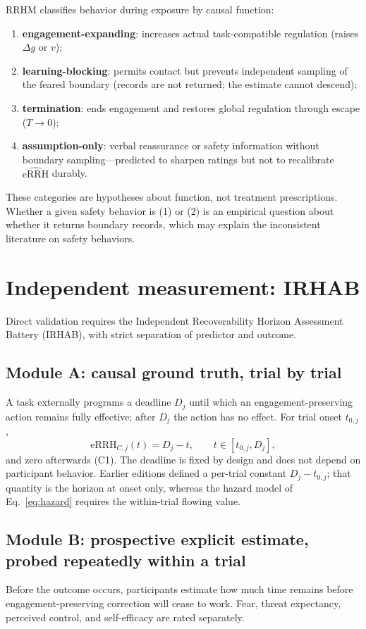 \documentclass[9pt,twocolumn]{article}
\newcommand{\eRRHhat}{\widehat{\mathrm{eRRH}}}
\begin{document}
RRHM classifies behavior during exposure by causal function:
\begin{enumerate}
\item \textbf{engagement-expanding}: increases actual task-compatible regulation (raises $\Delta g$ or $v$);
\item \textbf{learning-blocking}: permits contact but prevents independent sampling of the feared boundary (records are not returned; the estimate cannot descend);
\item \textbf{termination}: ends engagement and restores global regulation through escape ($T\to0$);
\item \textbf{assumption-only}: verbal reassurance or safety information without boundary sampling---predicted to sharpen ratings but not to recalibrate $\eRRHhat$ durably.
\end{enumerate}
These categories are hypotheses about function, not treatment prescriptions. Whether a given safety behavior is (1) or (2) is an empirical question about whether it returns boundary records, which may explain the inconsistent literature on safety behaviors.

\section{Independent measurement: IRHAB}
\label{sec:irhab}
Direct validation requires the Independent Recoverability Horizon Assessment Battery (IRHAB), with strict separation of predictor and outcome.

\subsection{Module A: causal ground truth, trial by trial}
A task externally programs a deadline $D_j$ until which an engagement-preserving action remains fully effective; after $D_j$ the action has no effect. For trial onset $t_{0,j}$,
\[
\mathrm{eRRH}_{C,j}(t)=D_j-t,\qquad t\in[t_{0,j},D_j],
\]
and zero afterwards (C1). The deadline is fixed by design and does not depend on participant behavior. Earlier editions defined a per-trial constant $D_j-t_{0,j}$; that quantity is the horizon at onset only, whereas the hazard model of Eq.~\ref{eq:hazard} requires the within-trial flowing value.

\subsection{Module B: prospective explicit estimate, probed repeatedly within a trial}
Before the outcome occurs, participants estimate how much time remains before engagement-preserving correction will cease to work. Fear, threat expectancy, perceived control, and self-efficacy are rated separately.
\end{document}
